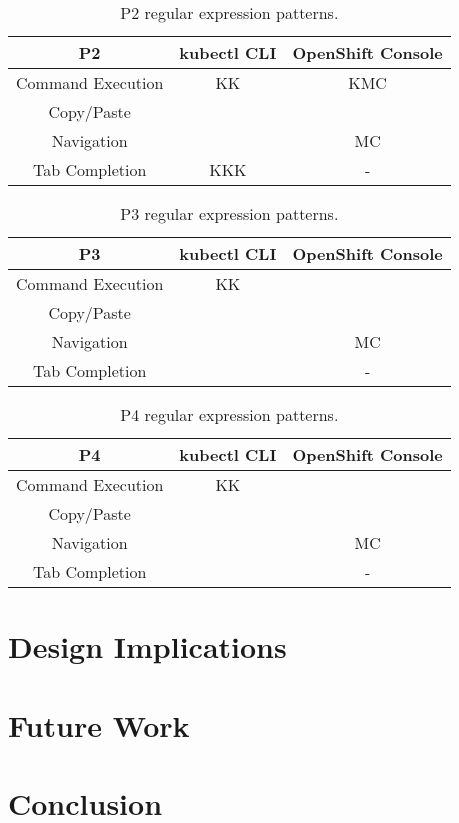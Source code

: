\documentclass[11pt, oneside]{article}   	%
\begin{document}
\begin{table}
 \centering
  \begin{tabular}{ | c | c | c | } 
  \hline
  P2 & kubectl CLI & OpenShift Console \\ 
  \hline
  Command Execution & KK & KMC \\ 
  \hline
  Copy/Paste & & \\
  \hline
  Navigation & & MC \\
  \hline
  Tab Completion & KKK & - \\
  \hline
  \end{tabular}
 \caption{P2 regular expression patterns.}
 \label{table:t7}
\end{table}

\begin{table}
 \centering
  \begin{tabular}{ | c | c | c | } 
  \hline
  P3 & kubectl CLI & OpenShift Console \\ 
  \hline
  Command Execution & KK &  \\ 
  \hline
  Copy/Paste & & \\
  \hline
  Navigation & & MC \\
  \hline
  Tab Completion & & - \\
  \hline
  \end{tabular}
 \caption{P3 regular expression patterns.}
 \label{table:t8}
\end{table}

\begin{table}
 \centering
  \begin{tabular}{ | c | c | c | } 
  \hline
  P4 & kubectl CLI & OpenShift Console \\ 
  \hline
  Command Execution & KK &  \\ 
  \hline
  Copy/Paste &  & \\
  \hline
  Navigation & & MC \\
  \hline
  Tab Completion & & - \\
  \hline
  \end{tabular}
 \caption{P4 regular expression patterns.}
 \label{table:t9}
\end{table}

\section{Design Implications}

\section{Future Work}

\section{Conclusion}



\end{document}
